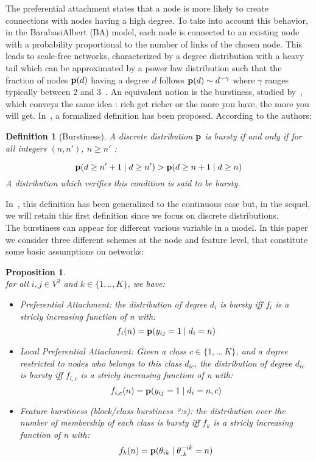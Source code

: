 \documentclass[a4paper, 12pt]{article}
\newtheorem{definition}{Definition}[section]
\newtheorem{proposition}{Proposition}[section]
\begin{document}
The preferential attachment states that a node is more likely to create connections with nodes having a high degree. To take into account this behavior, in the BarabasiAlbert (BA) model, each node is connected to an existing node with a probability proportional to the number of links of the chosen node. This leads to scale-free networks, characterized by a degree distribution with a heavy tail which can be approximated by a power law distribution such that the fraction of nodes $\mathbf{p}(d)$ having a degree $d$ follows $\mathbf{p}(d) \sim d^{-\gamma}$ where $\gamma$ ranges typically between 2 and 3~\cite{barabasi1999emergence}. An equivalent notion is the burstiness, studied by~\cite{church1995poisson}, which conveys the same idea : rich get richer or the more you have, the more you will get. In~\cite{clinchant2008bnb}, a formalized definition has been proposed. According to the authors:

\begin{definition}[Burstiness]
	A discrete distribution $\mathbf{p}$ is bursty if and only if for all integers $(n, n')$, $n \geq n'$ :
	
	\begin{equation}
	\mathbf{p}(d \geq n'+1 \mid d \geq n') > \mathbf{p}(d \geq n+1 \mid d \geq n) 
	\end{equation}
	 A distribution which verifies this condition is said to be bursty.
\end{definition}

In~\cite{clinchant2010information}, this definition has been generalized to the continuous case but, in the sequel, we will retain this first definition since we focus on discrete distributions.~\\

The burstiness can appear for different various variable in a model. In this paper we consider three different schemes at the node and feature level, that constitute some basic assumptions on networks:

\begin{proposition}~\\
for all $i,j \in V^2$ and $k \in \{1,.., K\}$, we have:
\begin{itemize}
	\item Preferential Attachment: the distribution of degree $d_i$ is bursty iff $f_i$ is a stricly increasing function of n with: $$f_i(n)=\mathbf{p}(y_{ij}=1 \mid d_i=n)$$
	\item Local Preferential Attachment: Given a class $c \in \{1,..,K\}$, and a degree restricted to nodes who belongs to this class $d_{ic}$, the distribution of degree $d_{ic}$ is bursty iff $f_{i,c}$ is a stricly increasing function of n with: $$f_{i,c}(n)=\mathbf{p}(y_{ij}=1 \mid d_i=n, c)$$
	\item Feature burstiness (block/class burstiness ?:s): the distribution over the number of membership of each class is bursty iff  $f_k$  is a stricly increasing function of n with: $$f_k(n) = \mathbf{p}(\theta_{ik} \mid \theta_{\bm{.}k}^{-ik}=n)$$ 
\end{itemize}
\end{proposition}
\end{document}
